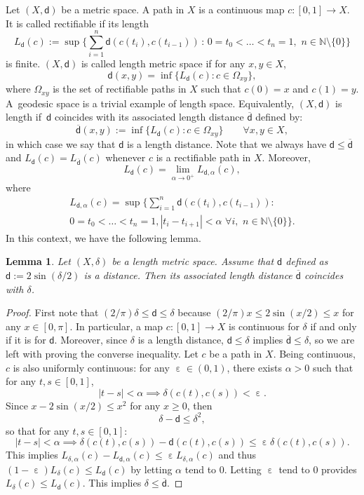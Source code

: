 \documentclass[JEP,XML,SOM,Unicode,published]{cedram}
\let\sep:
\let\backslash\setminus
\theoremstyle{plain}
\newtheorem{lemma}[theorem]{Lemma}
\theoremstyle{definition}
\newcommand{\setN}{\mathbb{N}}
\let\eps\upepsilon
\newcommand{\dist}{\mathsf{d}}
\begin{document}
Let $(X,\dist)$ be a metric space. A path in $X$ is a continuous map $c:[0,1]\to X$. It is called rectifiable if its length
\[\textstyle
L_\dist(c):=\sup \bigl\{ \sum_{i=1}^n \dist(c(t_i),c(t_{i-1})) \, \sep \, 0 = t_0 < \ldots < t_n = 1, \, \, n \in \setN\backslash\{0\} \bigr\}
\]
is finite. $(X,\dist)$ is called length metric space if for any $x, y \in X$,
\[
\dist(x,y) = \inf\{L_\dist (c) \sep c \in \Omega_{xy}\},
\]
where $\Omega_{xy}$ is the set of rectifiable paths in $X$ such that $c(0)=x$ and $c(1)=y$. A~geodesic space is a trivial example of length space. Equivalently, $(X,\dist)$ is length if~$\dist$ coincides with its associated length distance $\overline{\dist}$ defined by:
\[
\overline{\dist}(x,y):= \inf\{L_\dist (c) \sep c \in \Omega_{xy}\}\qquad \forall x,y \in X,
\]
in which case we say that $\dist$ is a length distance. Note that we always have $\dist \le \overline{\dist}$ and $L_{\dist}(c)=L_{\overline{\dist}}(c)$ whenever $c$ is a rectifiable path in $X$. Moreover,
\[
L_\dist(c) = \lim_{\alpha \to 0^+} L_{\dist,\alpha}(c),
\]
where
\begin{multline*}
\textstyle
L_{\dist,\alpha}(c) = \sup \bigl\{ \sum_{i=1}^n \dist(c(t_i),c(t_{i-1})) \sep\\ 0 = t_0 < \ldots < t_n = 1, |t_i - t_{i+1}|<\alpha \, \, \forall i,\, \, n \in \setN\backslash\{0\} \bigr\}.
\end{multline*}
In this context, we have the following lemma.

\begin{lemma}\label{lem:length}
Let $(X,\delta)$ be a length metric space. Assume that $\dist$ defined as $\dist:=2\sin(\delta/2)$ is a distance. Then its associated length distance $\overline{\dist}$ coincides with $\delta$.
\end{lemma}

\begin{proof}
First note that $(2/\pi) \delta \le \dist \le \delta$ because $(2/\pi)x\le 2\sin(x/2)\le x$ for any $x\in [0,\pi]$. In particular, a map $c:[0,1]\to X$ is continuous for $\delta$ if and only if it is for $\dist$. Moreover, since $\delta$ is a length distance, $\dist \le \delta$ implies $\overline{\dist} \le \delta$, so we are left with proving the converse inequality. Let $c$ be a path in $X$. Being continuous, $c$ is also uniformly continuous: for any $\eps\in (0,1)$, there exists $\alpha>0$ such that for any $t,s \in [0,1]$,
\[
|t-s| < \alpha \implies \delta(c(t),c(s)) < \eps.
\]
Since $x- 2\sin(x/2)\le x^2$ for any $x\ge0$, then
\[
\delta - \dist \le \delta^2,
\]
so that for any $t,s \in [0,1]$:
\[
|t-s| < \alpha \implies \delta(c(t),c(s)) - \dist(c(t),c(s)) \le \eps \delta(c(t),c(s)).
\]
This implies $L_{\delta,\alpha}(c) - L_{\dist,\alpha}(c) \le \eps L_{\delta,\alpha}(c)$ and thus $(1-\eps)L_\delta(c) \le L_\dist(c)$ by letting $\alpha$ tend to $0$. Letting $\eps$ tend to $0$ provides $L_\delta(c) \le L_\dist(c)$. This implies $\delta \le \overline{\dist}$.
\end{proof}
\end{document}
